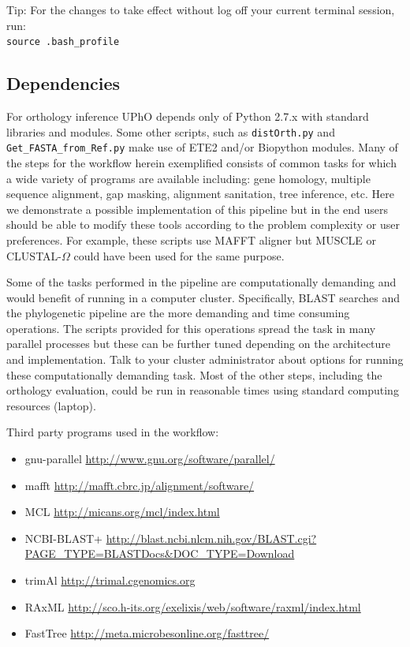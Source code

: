 \documentclass[10pt]{article}
\begin{document}
Tip: For the changes to take effect without log off your current terminal session, run:\\
\texttt{source .bash\_profile}

\subsection{Dependencies} For orthology inference UPhO depends only of
Python 2.7.x with standard libraries and modules. Some other scripts,
such as \texttt{distOrth.py} and \texttt{Get\_FASTA\_from\_Ref.py} make use of ETE2
and/or Biopython modules.  Many of the steps for the workflow herein
exemplified consists of common tasks for which a wide variety of
programs are available including: gene homology, multiple sequence
alignment, gap masking, alignment sanitation, tree inference,
etc. Here we demonstrate a possible implementation of this pipeline
but in the end users should be able to modify these tools according to
the problem complexity or user preferences. For example, these scripts use
MAFFT aligner but MUSCLE \citep{Edgar04} or CLUSTAL-$\Omega$ \citep{Sievers539} could have been used for the same purpose.

Some of the tasks performed in the pipeline are computationally demanding 
and would benefit of running in a computer cluster. Specifically,
BLAST searches and the phylogenetic pipeline are the more demanding
and time consuming operations. The scripts provided for this operations
spread the task in many parallel processes but these can be further tuned
depending on the architecture and implementation. Talk to your cluster administrator
about options for running these computationally demanding task. 
Most of the other steps, including the orthology evaluation, 
could be run in reasonable times using standard computing resources (laptop).

Third party programs used in the workflow:

\begin{itemize}
\item{gnu-parallel} \citep{Tange2011}
\url{http://www.gnu.org/software/parallel/}
\item{mafft} \citep{Katoh2013}
\url{http://mafft.cbrc.jp/alignment/software/}
\item{MCL} \citep{vanDongen2000} \url{http://micans.org/mcl/index.html}
\item{NCBI-BLAST+} \citep{Camacho2009}
\url{http://blast.ncbi.nlcm.nih.gov/BLAST.cgi?PAGE_TYPE=BLASTDocs&DOC_TYPE=Download}
\item{trimAl} \citep{Capella-Gutierrez2009} \url{http://trimal.cgenomics.org}
\item{RAxML} \citep{Stamatakis2014}
\url{http://sco.h-its.org/exelixis/web/software/raxml/index.html}
\item{FastTree} \citep{Price2010}\url{http://meta.microbesonline.org/fasttree/}
\end{itemize}
\end{document}
